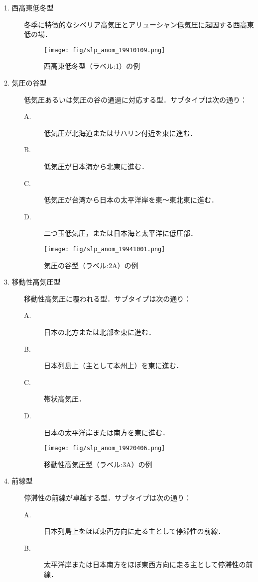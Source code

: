 \documentclass{jarticle}
\theoremstyle{definition}
\begin{document}
\begin{description}
\item[1. 西高東低冬型] 冬季に特徴的なシベリア高気圧とアリューシャン低気圧に起因する西高東低の場．

\begin{figure}[H] \centering \texttt{[image: fig/slp\_anom\_19910109.png]} \caption{西高東低冬型（ラベル:1）の例} \label{fig:slp_anom_19910109} \end{figure}

\item[2. 気圧の谷型] 低気圧あるいは気圧の谷の通過に対応する型．サブタイプは次の通り：
  \begin{description}
    \item[A.] 低気圧が北海道またはサハリン付近を東に進む．
    \item[B.] 低気圧が日本海から北東に進む．
    \item[C.] 低気圧が台湾から日本の太平洋岸を東〜東北東に進む．
    \item[D.] 二つ玉低気圧，または日本海と太平洋に低圧部．
  \end{description}

\begin{figure}[H] \centering \texttt{[image: fig/slp\_anom\_19941001.png]} \caption{気圧の谷型（ラベル:2A）の例} \label{fig:slp_anom_19941001} \end{figure}

\item[3. 移動性高気圧型] 移動性高気圧に覆われる型．サブタイプは次の通り：
  \begin{description}
    \item[A.] 日本の北方または北部を東に進む．
    \item[B.] 日本列島上（主として本州上）を東に進む．
    \item[C.] 帯状高気圧．
    \item[D.] 日本の太平洋岸または南方を東に進む．
  \end{description}

\begin{figure}[H] \centering \texttt{[image: fig/slp\_anom\_19920406.png]} \caption{移動性高気圧型（ラベル:3A）の例} \label{fig:slp_anom_19920406} \end{figure}

\item[4. 前線型] 停滞性の前線が卓越する型．サブタイプは次の通り：
  \begin{description}
    \item[A.] 日本列島上をほぼ東西方向に走る主として停滞性の前線．
    \item[B.] 太平洋岸または日本南方をほぼ東西方向に走る主として停滞性の前線．
  \end{description}


\end{description}
\end{document}
